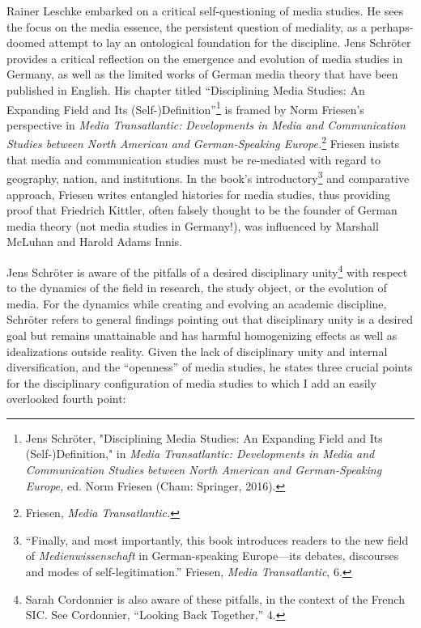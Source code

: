 \documentclass{tufte-handout}
\begin{document}
Rainer Leschke embarked on a critical self-questioning of media studies.
He sees the focus on the media essence, the persistent question of
mediality, as a perhaps-doomed attempt to lay an ontological foundation
for the discipline. Jens Schröter provides a critical reflection on the
emergence and evolution of media studies in Germany, as well as the
limited works of German media theory that have been published in
English. His chapter titled ``Disciplining Media Studies: An Expanding
Field and Its (Self-)Definition''\footnote{Jens Schröter, "Disciplining
  Media Studies: An Expanding Field and Its (Self-)Definition," in
  \emph{Media Transatlantic: Developments in Media and Communication
  Studies between North American and German-Speaking Europe,} ed. Norm
  Friesen (Cham: Springer, 2016).} is framed by Norm Friesen's
perspective in \emph{Media Transatlantic:} \emph{Developments in Media
and Communication Studies between North American and German-Speaking
Europe.}\footnote{Friesen, \emph{Media Transatlantic.}} Friesen insists
that media and communication studies must be re-mediated with regard to
geography, nation, and institutions. In the book's
introductory\footnote{``Finally, and most importantly, this book
  introduces readers to the new field of \emph{Medienwissenschaft} in
  German-speaking Europe---its debates, discourses and modes of
  self-legitimation.'' Friesen, \emph{Media Transatlantic}, 6.} and
comparative approach, Friesen writes entangled histories for media
studies, thus providing proof that Friedrich Kittler, often falsely
thought to be the founder of German media theory (not media studies in
Germany!), was influenced by Marshall McLuhan and Harold Adams Innis.

Jens Schröter is aware of the pitfalls of a desired disciplinary
unity\footnote{Sarah Cordonnier is also aware of these pitfalls, in the
  context of the French SIC. See Cordonnier, ``Looking Back Together,''
  4.} with respect to the dynamics of the field in research, the study
object, or the evolution of media. For the dynamics while creating and
evolving an academic discipline, Schröter refers to general findings
pointing out that disciplinary unity is a desired goal but remains
unattainable and has harmful homogenizing effects as well as
idealizations outside reality. Given the lack of disciplinary unity and
internal diversification, and the ``openness'' of media studies, he
states three crucial points for the disciplinary configuration of media
studies to which I add an easily overlooked fourth point:
\end{document}
